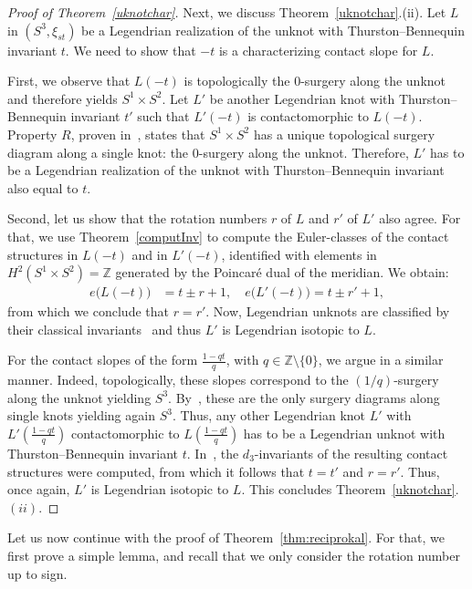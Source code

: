 \documentclass[11pt]{amsart} %
\newcommand{\Z}{\mathbb{Z}}
\theoremstyle{plain}
\theoremstyle{definition}
\begin{document}
\begin{proof}[Proof of Theorem~\ref{uknotchar}]
	Next, we discuss Theorem~\ref{uknotchar}.(ii). Let $L$ in $(S^3,\xi_{st})$ be a Legendrian realization of the unknot with Thurston--Benne\-quin invariant $t$. We need to show that $-t$ is a characterizing contact slope for $L$.
	
	First, we observe that $L(-t)$ is topologically the $0$-surgery along the unknot and therefore yields $S^1\times S^2$. Let $L'$ be another Legendrian knot with Thurston--Bennequin invariant $t'$ such that $L'(-t)$ is contactomorphic to $L(-t)$. Property $R$, proven in~\cite{Gabai87}, states that $S^1\times S^2$ has a unique topological surgery diagram along a single knot: the $0$-surgery along the unknot. Therefore, $L'$ has to be a Legendrian realization of the unknot with Thurston--Bennequin invariant also equal to $t$.
	
	Second, let us show that the rotation numbers $r$ of $L$ and $r'$ of $L'$ also agree. For that, we use Theorem~\ref{computInv} to compute the Euler-classes of the contact structures in $L(-t)$ and in $L'(-t)$, identified with elements in $H^2(S^1\times S^2)=\Z$ generated by the Poincar\'e dual of the meridian. We obtain:
	\begin{align*}
	e\big(L(-t)\big)&=t\pm r+1,\quad e\big(L'(-t)\big)=t\pm r'+1,
	\end{align*}
	from which we conclude that $r=r'$. Now, Legendrian unknots are classified by their classical invariants~\cite{EliashbergFraser98} and thus $L'$ is Legendrian isotopic to $L$. 
	
	For the contact slopes of the form $\frac{1-qt}{q}$, with $q\in\Z\setminus\{0\}$, we argue in a similar manner. Indeed, topologically, these slopes correspond to the $(1/q)$-surgery along the unknot yielding $S^3$. By~\cite{GordonLuecke89}, these are the only surgery diagrams along single knots yielding again $S^3$. Thus, any other Legendrian knot $L'$ with $L'(\frac{1-qt}{q})$ contactomorphic to $L(\frac{1-qt}{q})$ has to be a Legendrian unknot with Thurston--Bennequin invariant $t$. In~\cite{EtnyreKegelOnaranPre}, the $d_3$-invariants of the resulting contact structures were computed, from which it follows that $t=t'$ and $r=r'$. Thus, once again, $L'$ is Legendrian isotopic to $L$. This concludes Theorem~\ref{uknotchar}.$(ii)$.
\end{proof}

Let us now continue with the proof of Theorem~\ref{thm:reciprokal}. For that, we first prove a simple lemma, and recall that we only consider the rotation number up to sign.
\end{document}
